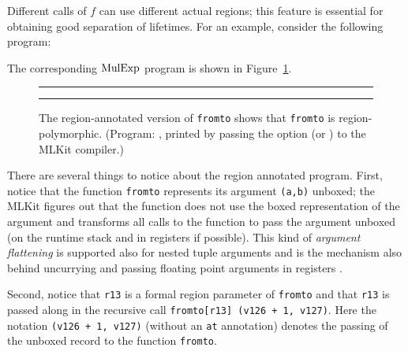 \documentclass[12pt]{book}
\begin{document}
Different calls of $f$ can use different actual regions; this feature is
essential for obtaining good separation of lifetimes.  For an example, consider
the following program:
The corresponding $\hbox{\rm MulExp}$ program is shown in Figure~\ref{fromto.fig}.
\begin{figure}[htb]
\hrule
\medskip
{}
\caption{The region-annotated version of \lstinline{fromto} shows that
  \lstinline{fromto} is region-polymorphic. (Program:
  , printed by passing the option
   (or ) to the MLKit
  compiler.)}
\medskip

\hrule
\label{fromto.fig}
\end{figure}

There are several things to notice about the region annotated program.  First,
notice that the function {\tt fromto} represents its argument \lstinline{(a,b)}
%
%
%
%
%
%
%
unboxed; the MLKit figures out that the function does not use the boxed
representation of the argument and transforms all calls to the function to pass
the argument unboxed (on the runtime stack and in registers if possible). This
kind of \emph{argument flattening} is supported also for nested tuple arguments
and is the mechanism also behind uncurrying and passing floating point arguments
in registers \cite{deep-elsman25}.

Second, notice that \lstinline{r13} is a formal region parameter of
\lstinline{fromto} and that \lstinline{r13} is passed along in the recursive
call
%
\lstinline{fromto[r13] (v126 + 1, v127)}. Here the notation
%
\lstinline{(v126 + 1, v127)}
%
(without an \lstinline{at} annotation) denotes the passing of the unboxed record
to the function \lstinline{fromto}.
\end{document}

